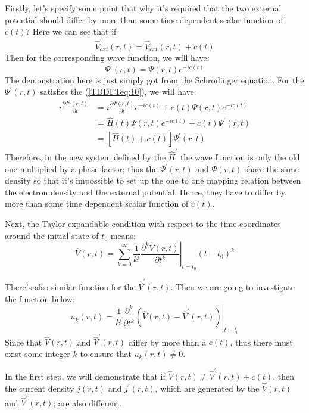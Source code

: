 Firstly, let's specify some point that why it's required that the
two external potential should differ by more than some time
dependent scalar function of $c(t)$? Here we can see that if
\begin{equation}\label{}
\hat{V}^{'}_{ext}(r,t) = \hat{V}_{ext}(r,t) + c(t)
\end{equation}
Then for the corresponding wave function, we will have:
\begin{equation}\label{TDDFTeq:10}
\Psi^{'}(r,t) = \Psi(r,t)e^{-ic(t)}
\end{equation}
The demonstration here is just simply got from the Schrodinger
equation. For the $\Psi^{'}(r,t)$ satisfies the (\ref{TDDFTeq:10}),
we will have:
\begin{align}\label{}
i \frac{\partial \Psi^{'}(r,t)}{\partial t} &= i \frac{\partial
\Psi(r,t)}{\partial t}e^{-ic(t)} + c(t)\Psi(r,t)e^{-ic(t)} \nonumber
\\
&=\hat{H}(t)\Psi(r,t)e^{-ic(t)} + c(t)\Psi^{'}(r,t) \nonumber
\\
&=[\hat{H}(t)+c(t)]\Psi^{'}(r,t)
\end{align}
Therefore, in the new system defined by the $\hat{H}^{'}$ the wave
function is only the old one multiplied by a phase factor; thus the
$\Psi^{'}(r,t)$ and $\Psi(r,t)$ share the same density so that it's
impossible to set up the one to one mapping relation between the
electron density and the external potential. Hence, they have to
differ by more than some time dependent scalar function of $c(t)$.

Next, the Taylor expandable condition with respect to the time
coordinates around the initial state of $t_{0}$ means:
\begin{equation}\label{}
\hat{V}(r,t) =
\sum^{\infty}_{k=0}\left.\frac{1}{k!}\frac{\partial^{k}\hat{V}(r,t)}
{\partial t^{k}} \right|_{t=t_{0}} (t-t_{0})^{k}
\end{equation}

There's also similar function for the $\hat{V}^{'}(r,t)$. Then we
are going to investigate the function below:
\begin{equation}\label{TDDFTeq:5}
u_{k}(r,t) =\left.\frac{1}{k!}\frac{\partial^{k}}{\partial
t^{k}}(\hat{V}(r,t) - \hat{V}^{'}(r,t)) \right|_{t=t_{0}}
\end{equation}
Since that $\hat{V}(r,t)$ and $\hat{V}^{'}(r,t)$ differ by more than
a $c(t)$, thus there must exist some integer $k$ to ensure that
$u_{k}(r,t) \neq 0$.

In the first step, we will demonstrate that if $\hat{V}(r,t) \neq
\hat{V}^{'}(r,t) + c(t)$, then the current density $j(r,t)$ and
$j^{'}(r,t)$, which are generated by the $\hat{V}(r,t)$ and
$\hat{V}^{'}(r,t)$; are also different.

